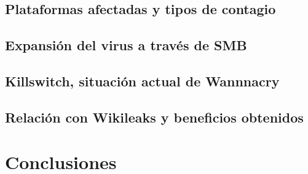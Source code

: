\documentclass[a4paper,10pt]{article}
\begin{document}
\subsection{Plataformas afectadas y tipos de contagio}

\subsection{Expansión del virus a través de SMB}

\subsection{Killswitch, situación actual de Wannnacry}
\label{KillSwitch}

\subsection{Relación con Wikileaks y beneficios obtenidos}





\section{Conclusiones}





\newpage

\end{document}
